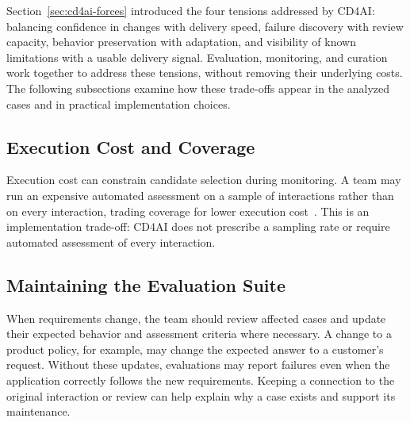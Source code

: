 Section~\ref{sec:cd4ai-forces} introduced the four tensions addressed by
CD4AI: balancing confidence in changes with delivery speed, failure discovery
with review capacity, behavior preservation with adaptation, and visibility of
known limitations with a usable delivery signal. Evaluation, monitoring, and
curation work together to address these tensions, without removing their
underlying costs. The following subsections examine how these trade-offs appear
in the analyzed cases and in practical implementation choices.


\subsection{Execution Cost and Coverage}

Execution cost can constrain candidate selection during monitoring. A team may
run an expensive automated assessment on a sample of interactions rather than
on every interaction, trading coverage for lower execution
cost~\parencite{Databricks:ProductionMonitoring}. This is an implementation
trade-off: CD4AI does not prescribe a sampling rate or require automated
assessment of every interaction.

\subsection{Maintaining the Evaluation Suite}

When requirements change, the team should review affected cases and update
their expected behavior and assessment criteria where necessary. A change to
a product policy, for example, may change the expected answer to a customer's
request. Without these updates, evaluations may report failures even when the
application correctly follows the new requirements. Keeping a connection to
the original interaction or review can help explain why a case exists and
support its maintenance.

